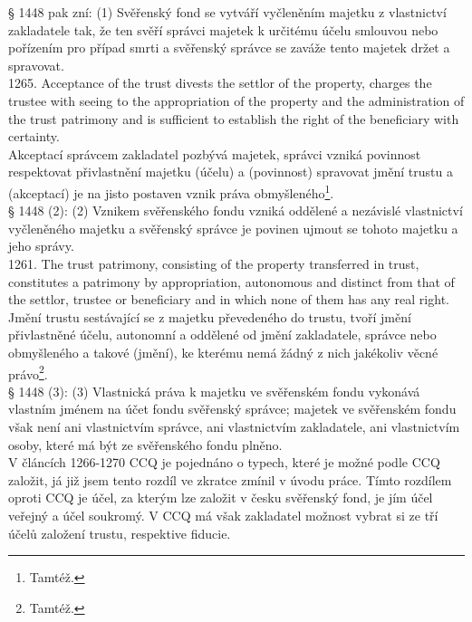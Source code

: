 \documentclass{article}
\begin{document}
§ 1448 pak zní:
(1) Svěřenský fond se vytváří vyčleněním majetku z vlastnictví zakladatele tak, že ten svěří správci majetek k určitému účelu smlouvou nebo pořízením pro případ smrti a svěřenský správce se zaváže tento majetek držet a spravovat.\\

1265. Acceptance of the trust divests the settlor of the property, charges the trustee with seeing to the appropriation of the property and the administration of the trust patrimony and is sufficient to establish the right of the beneficiary with certainty.\\

Akceptací správcem zakladatel pozbývá majetek, správci vzniká povinnost respektovat přivlastnění majetku (účelu) a (povinnost) spravovat jmění trustu a (akceptací) je na jisto postaven vznik práva obmyšleného\footnote{Tamtéž.}.\\

§ 1448 (2):
(2) Vznikem svěřenského fondu vzniká oddělené a nezávislé vlastnictví vyčleněného majetku a svěřenský správce je povinen ujmout se tohoto majetku a jeho správy.\\

1261. The trust patrimony, consisting of the property transferred in trust, constitutes a patrimony by appropriation, autonomous and distinct from that of the settlor, trustee or beneficiary and in which none of them has any real right.\\

Jmění trustu sestávající se z majetku převedeného do trustu, tvoří jmění přivlastněné účelu, autonomní a oddělené od jmění zakladatele, správce nebo obmyšleného a takové (jmění), ke kterému nemá žádný z nich jakékoliv věcné právo\footnote{Tamtéž.}.\\

§ 1448 (3):
(3) Vlastnická práva k majetku ve svěřenském fondu vykonává vlastním jménem na účet fondu svěřenský správce; majetek ve svěřenském fondu však není ani vlastnictvím správce, ani vlastnictvím zakladatele, ani vlastnictvím osoby, které má být ze svěřenského fondu plněno. \\

V článcích 1266-1270 CCQ je pojednáno o typech, které je možné podle CCQ založit, já již jsem tento rozdíl ve zkratce zmínil v úvodu práce. Tímto rozdílem oproti CCQ je účel, za kterým lze založit v česku svěřenský fond, je jím účel veřejný a účel soukromý. V CCQ má však zakladatel možnost vybrat si ze tří účelů založení trustu, respektive fiducie.\\
\end{document}
